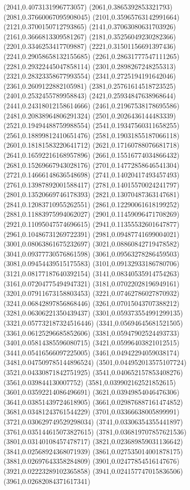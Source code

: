 {(2041,0.4073131996773057)
(2061,0.3865392853321793)
(2081,0.37660067095908045)
(2101,0.35965763142991664)
(2121,0.3700150712793865)
(2141,0.37063080631703926)
(2161,0.3666813309581267)
(2181,0.35256049230282366)
(2201,0.3346253417709887)
(2221,0.31501156691397436)
(2241,0.29058658132155685)
(2261,0.28631777547111265)
(2281,0.29322445047858114)
(2301,0.2898267248255313)
(2321,0.28323358677993554)
(2341,0.2725194191642046)
(2361,0.2609122882105981)
(2381,0.25761614518723525)
(2401,0.2532455789958843)
(2421,0.25934847638968644)
(2441,0.24318012158614666)
(2461,0.21967538178695586)
(2481,0.20838964806291324)
(2501,0.2026436144483339)
(2521,0.19494488759988554)
(2541,0.19347560311658255)
(2561,0.18899812410651476)
(2581,0.19031855187066118)
(2601,0.18181583220641712)
(2621,0.17160788076681718)
(2641,0.16592216168957896)
(2661,0.15516774034866432)
(2681,0.15269667943028176)
(2701,0.14772858646541304)
(2721,0.14666148636548698)
(2741,0.14020417493457493)
(2761,0.13987892001588417)
(2781,0.14015570024241797)
(2801,0.13520669746178393)
(2821,0.13070487363147681)
(2841,0.12083710955262551)
(2861,0.12290061618199252)
(2881,0.11883975994062027)
(2901,0.11459096471708269)
(2921,0.11095047574696615)
(2941,0.11355532601647877)
(2961,0.10486731269722391)
(2981,0.09487741699004021)
(3001,0.08063861675232697)
(3021,0.08860842719478582)
(3041,0.09377730576861598)
(3061,0.09563278286459503)
(3081,0.09454439515175583)
(3101,0.09132933186780706)
(3121,0.08177187640392154)
(3141,0.08340535914754263)
(3161,0.07204775494947321)
(3181,0.07022028196949161)
(3201,0.07911673158803453)
(3221,0.07462786027870932)
(3241,0.06842897856868446)
(3261,0.07015043707388212)
(3281,0.06306221350439437)
(3301,0.059373554991299135)
(3321,0.057732187324516446)
(3341,0.05694645681521505)
(3361,0.06125296685852606)
(3381,0.05947902524493733)
(3401,0.05814385596080715)
(3421,0.05996403821012515)
(3441,0.05416566097225005)
(3461,0.04942294059038174)
(3481,0.047509785144896524)
(3501,0.044952013575107724)
(3521,0.04330871842751925)
(3541,0.040652157853408276)
(3561,0.039844130007752)
(3581,0.039902162521852615)
(3601,0.03592214086496691)
(3621,0.03949854046476306)
(3641,0.03851439724618905)
(3661,0.029876887161474852)
(3681,0.03481243761544229)
(3701,0.03366638005899991)
(3721,0.030629749529298034)
(3741,0.03306354355441897)
(3761,0.035144615073827615)
(3781,0.036819707857621536)
(3801,0.03140108457478717)
(3821,0.023689859031136642)
(3841,0.02568924368071939)
(3861,0.027535014001878175)
(3881,0.02697643358284809)
(3901,0.02477854516147676)
(3921,0.02223289102365858)
(3941,0.024157747015836506)
(3961,0.02682084371617341)
}
